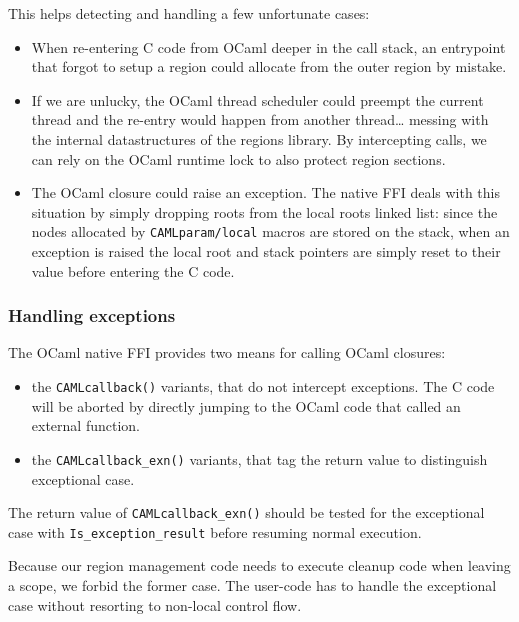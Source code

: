 \documentclass[a4paper]{easychair}
\begin{document}
This helps detecting and handling a few unfortunate cases:

\begin{itemize}
\item
  When re-entering C code from OCaml deeper in the call stack, an
  entrypoint that forgot to setup a region could allocate from the outer
  region by mistake.
\item
  If we are unlucky, the OCaml thread scheduler could preempt the
  current thread and the re-entry would happen from another
  thread\ldots{} messing with the internal datastructures of the regions
  library. By intercepting calls, we can rely on the OCaml runtime lock
  to also protect region sections.
\item
  The OCaml closure could raise an exception. The native FFI deals with
  this situation by simply dropping roots from the local roots linked
  list: since the nodes allocated by \texttt{CAMLparam/local} macros are
  stored on the stack, when an exception is raised the local root and
  stack pointers are simply reset to their value before entering the C
  code.
\end{itemize}

\hypertarget{handling-exceptions}{%
\subsubsection{Handling exceptions}\label{handling-exceptions}}

The OCaml native FFI provides two means for calling OCaml closures:

\begin{itemize}
\tightlist
\item
  the \texttt{CAMLcallback()} variants, that do not intercept
  exceptions. The C code will be aborted by directly jumping to the
  OCaml code that called an external function.
\item
  the \texttt{CAMLcallback\_exn()} variants, that tag the return value
  to distinguish exceptional case.
\end{itemize}

The return value of \texttt{CAMLcallback\_exn()} should be tested for
the exceptional case with \texttt{Is\_exception\_result} before resuming
normal execution.

Because our region management code needs to execute cleanup code when
leaving a scope, we forbid the former case. The user-code has to handle
the exceptional case without resorting to non-local control flow.
\end{document}
